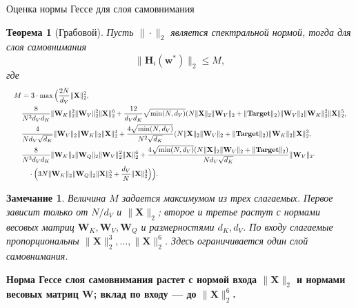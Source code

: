 \documentclass[9pt,pdf,hyperref={unicode}]{beamer}
\newtheorem{rustheorem}{Теорема}
\newtheorem{rusremark}{Замечание}
\newcommand{\key}[1]{\par\vspace{0.5ex}\noindent\textbf{\color{darkgreen}#1}}
\begin{document}
\begin{frame}{Оценка нормы Гессе для слоя самовнимания}
\justifying
\small
\begin{rustheorem}[Грабовой]
    Пусть $\|\cdot\|_2$ является спектральной нормой, тогда для слоя самовнимания
    \[
        \|\mathbf{H}_i(\mathbf{w}^*)\|_2 \leq M,
    \]
    где
    \[
    \resizebox{\textwidth}{!}{$\begin{aligned}
    M &= 3\cdot\max \Big(\frac{2N}{d_V} \| \mathbf{X}\|^2_2, \\
        &\frac{8}{N^3 d_V d_K} \| \mathbf{W}_K\|_2^2 \| \mathbf{W}_V\|^2_2 \| \mathbf{X}\|^6_2 + \frac{12}{d_V d_K} \sqrt{\min(N, d_V)} (N \|\mathbf{X}\|_2 \|\mathbf{W}_V \|_2 + \|\textbf{Target}\|_2) \| \mathbf{W}_V \|_2 \| \mathbf{W}_K\|^2_2 \| \mathbf{X}\|^5_2, \\
        &\frac{4}{N d_V \sqrt{d_K}} \| \mathbf{W}_V\|_2 \| \mathbf{W}_K \|_2 \| \mathbf{X}\|^4_2 + \frac{4\sqrt{\min(N, d_V)}}{N^2\sqrt{d_K}} (N \|\mathbf{X}\|_2 \|\mathbf{W}_V \|_2 + \|\textbf{Target}\|_2) \|\mathbf{W}_K\|_2 \|\mathbf{X}\|^3_2, \\
        &\frac{8}{N^3 d_V d_K} \|\mathbf{W}_K\|_2 \|\mathbf{W}_Q\|_2 \| \mathbf{W}_V\|^2_2 \|\mathbf{X} \|^6_2 + \frac{4\sqrt{\min(N, d_V)} (N \|\mathbf{X}\|_2 \|\mathbf{W}_V \|_2 + \|\textbf{Target}\|_2)}{N d_V \sqrt{d_K}} \|\mathbf{W}_V\|_2 \cdot\\
        &\quad\cdot\Big(3N \|\mathbf{W}_K\|_2 \|\mathbf{W}_Q\|_2 \| \mathbf{X}\|^5_2 + \frac{d_V}{N} \|\mathbf{X}\|^3_2\Big)\Big).
    \end{aligned}$}
    \]
\end{rustheorem}
\begin{rusremark}
    Величина $M$ задается максимумом из трех слагаемых. Первое зависит только от $N/d_V$ и $\|\mathbf{X}\|_2$; второе и третье растут с нормами весовых матриц $\mathbf{W}_K,\mathbf{W}_V,\mathbf{W}_Q$ и размерностями $d_K,d_V$. По входу слагаемые пропорциональны $\|\mathbf{X}\|_2^3,\ldots,\|\mathbf{X}\|_2^6$. Здесь ограничивается один слой самовнимания.
\end{rusremark}
\key{Норма Гессе слоя самовнимания растет с нормой входа $\|\mathbf{X}\|_2$ и нормами весовых матриц $\mathbf{W}$; вклад по входу --- до $\|\mathbf{X}\|_2^6$.}
\end{frame}
\end{document}
